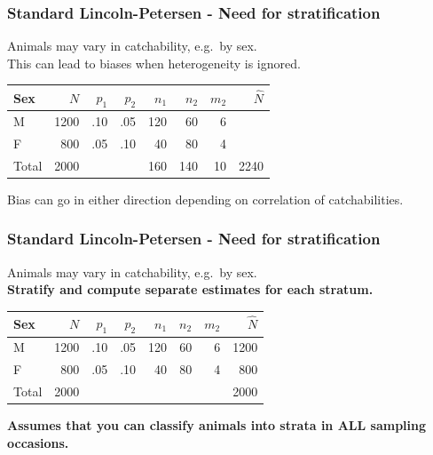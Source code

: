 \documentclass{beamer}
\begin{document}
\begin{frame}\frametitle{Standard Lincoln-Petersen - Need for stratification}
Animals may vary in catchability, e.g.\ by sex.\\
This can lead to biases when heterogeneity is ignored.\\[5mm]

\begin{tabular}{lrrr | rrr | r}
Sex & $N$ &  $p_1$ & $p_2$ &   $n_1$ & $n_2$ & $m_2$ & $\widehat{N}$ \\ \hline
M &  1200 & .10  & .05 &   120 &  60  &  6    \\
F  &    800 & .05  & .10 &     40 &  80  &  4     \\ \hline
Total & 2000 &     &       &   160 & 140 & 10 & 2240 \\ \hline
\end{tabular}

\vspace{3mm}
Bias can go in either direction depending on correlation of catchabilities.

 
\end{frame}


\begin{frame}\frametitle{Standard Lincoln-Petersen - Need for stratification}
Animals may vary in catchability, e.g.\ by sex. \\[2mm]
{\bf Stratify and compute separate estimates for each stratum.}\\[5mm]

\begin{tabular}{lrrr | rrr | r}
Sex & $N$ &  $p_1$ & $p_2$ &   $n_1$ & $n_2$ & $m_2$ & $\widehat{N}$ \\ \hline
M &  1200 & .10  & .05 &   120 &  60  &  6  &   1200\\
F  &    800 & .05  & .10 &     40 &  80  &  4  & 800   \\ \hline
Total & 2000 &     &       &    &  &  & 2000 \\ \hline
\end{tabular}

\vspace{3mm}
{\bf Assumes that you can classify animals into strata in ALL sampling occasions.}

 
\end{frame}
\end{document}
